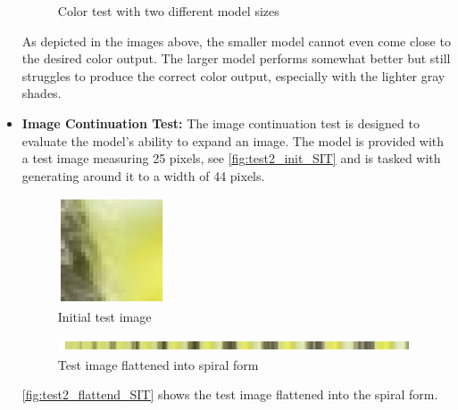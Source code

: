 \begin{itemize}
\begin{figure}[H]
\begin{minipage}{0.40\textwidth}
                \label{fig:test0_2_M5_SIT}
            \end{minipage}
            \caption{Color test with two different model sizes}
        \end{figure}
        
        As depicted in the images above, the smaller model cannot even come close to the desired color output. The larger model performs somewhat better but still struggles to produce the correct color output, especially with the lighter gray shades.
        
        \item \textbf{Image Continuation Test:} The image continuation test is designed to evaluate the model's ability to expand an image. The model is provided with a test image measuring 25 pixels, see \autoref{fig:test2_init_SIT} and is tasked with generating around it to a width of 44 pixels.

        \begin{figure}[H]
            \centering
            \includegraphics[width=0.3\textwidth]{imgs/ImageTest_5.0.1.0_init.png}
            \caption{Initial test image}
            \label{fig:test2_init_SIT}
        \end{figure}
        
        \begin{figure}[H]
            \centering
            \includegraphics[width=\textwidth]{imgs/ImageTest_5.0.1.0_flattend.png}
            \caption{Test image flattened into spiral form}
            \label{fig:test2_flattend_SIT}
        \end{figure}
        
        \autoref{fig:test2_flattend_SIT} shows the test image flattened into the spiral form.
        

\end{itemize}
